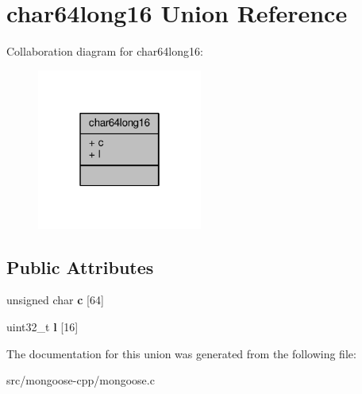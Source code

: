 \hypertarget{unionchar64long16}{}\section{char64long16 Union Reference}
\label{unionchar64long16}


Collaboration diagram for char64long16\+:
\nopagebreak
\begin{figure}[H]
\begin{center}
\leavevmode
\includegraphics[width=154pt]{df/d88/unionchar64long16__coll__graph}
\end{center}
\end{figure}
\subsection*{Public Attributes}
\begin{DoxyCompactItemize}
\item 
unsigned char {\bfseries c} \mbox{[}64\mbox{]}\hypertarget{unionchar64long16_a7067dbe3b0ff3f11661acb8cd97bcff9}{}\label{unionchar64long16_a7067dbe3b0ff3f11661acb8cd97bcff9}

\item 
uint32\+\_\+t {\bfseries l} \mbox{[}16\mbox{]}\hypertarget{unionchar64long16_a4f1edebae3468a551ff2d0cdaecb467d}{}\label{unionchar64long16_a4f1edebae3468a551ff2d0cdaecb467d}

\end{DoxyCompactItemize}


The documentation for this union was generated from the following file\+:\begin{DoxyCompactItemize}
\item 
src/mongoose-\/cpp/mongoose.\+c\end{DoxyCompactItemize}
